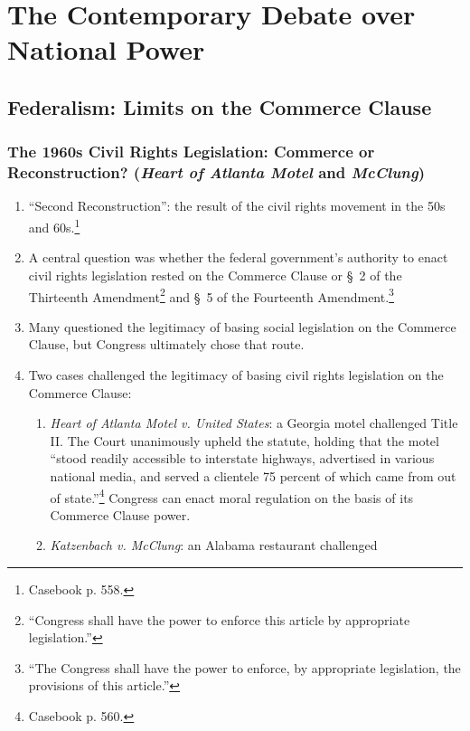 \section{The Contemporary Debate over National Power}

\subsection{Federalism: Limits on the Commerce Clause}

\subsubsection{The 1960s Civil Rights Legislation: Commerce or Reconstruction? 
(\emph{Heart of Atlanta Motel} and \emph{McClung})}

\begin{enumerate}
    \item ``Second Reconstruction'': the result of the civil rights movement 
    in the 50s and 60s.\footnote{Casebook p. 558.}
    \item A central question was whether the federal government's authority to 
    enact civil rights legislation rested on the Commerce Clause or \S\ 2 
    of the Thirteenth Amendment\footnote{``Congress shall have the power to 
    enforce this article by appropriate legislation.''} and \S\ 5 of the 
    Fourteenth Amendment.\footnote{``The Congress shall have the power to 
    enforce, by appropriate legislation, the provisions of this article.''}
    \item Many questioned the legitimacy of basing social legislation on the 
    Commerce Clause, but Congress ultimately chose that route.
    \item Two cases challenged the legitimacy of basing civil rights 
    legislation on the Commerce Clause:
    \begin{enumerate}
        \item \emph{Heart of Atlanta Motel v. United States}: a Georgia motel 
        challenged Title II. The Court unanimously upheld the statute, holding 
        that the motel ``stood readily accessible to interstate highways, 
        advertised in various national media, and served a clientele 75 
        percent of which came from out of state.''\footnote{Casebook p. 560.} 
        Congress can enact moral regulation on the basis of its Commerce 
        Clause power.
        \item \emph{Katzenbach v. McClung}: an Alabama restaurant challenged 

\end{enumerate}
\end{enumerate}
